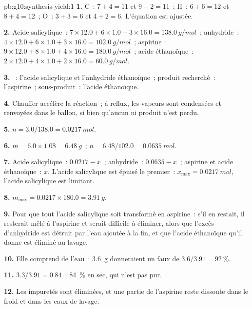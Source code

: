 \begin{solution}{pb:g10:synthesis-yield:1}
\textbf{1.} C~: $7 + 4 = 11$ et $9 + 2 = 11$~; H~: $6 + 6 = 12$ et
$8 + 4 = 12$~; O~: $3 + 3 = 6$ et $4 + 2 = 6$. L'équation est ajustée.

\textbf{2.} Acide salicylique~: $7 \times 12.0 + 6 \times 1.0 + 3 \times 16.0
= \qty{138.0}{g/mol}$~; anhydride~: $4 \times 12.0 + 6 \times 1.0 +
3 \times 16.0 = \qty{102.0}{g/mol}$~; aspirine~: $9 \times 12.0 + 8 \times
1.0 + 4 \times 16.0 = \qty{180.0}{g/mol}$~; acide éthanoïque~: $2 \times 12.0
+ 4 \times 1.0 + 2 \times 16.0 = \qty{60.0}{g/mol}$.

\textbf{3.} ~: l'acide salicylique et l'anhydride éthanoïque~;
produit recherché~: l'aspirine~; sous-produit~: l'acide éthanoïque.

\textbf{4.} Chauffer accélère la réaction~; à reflux, les vapeurs sont
condensées et renvoyées dans le ballon, si bien qu'aucun  ni
produit n'est perdu.

\textbf{5.} $n = 3.0 / 138.0 = \qty{0.0217}{mol}$.

\textbf{6.} $m = 6.0 \times 1.08 = \qty{6.48}{g}$~;
$n = 6.48 / 102.0 = \qty{0.0635}{mol}$.

\textbf{7.} Acide salicylique~: $0.0217 - x$~; anhydride~: $0.0635 - x$~;
aspirine et acide éthanoïque~: $x$. L'acide salicylique est épuisé le
premier~: $x_{\max} = \qty{0.0217}{mol}$, l'acide salicylique est
limitant.

\textbf{8.} $m_{\max} = 0.0217 \times 180.0 = \qty{3.91}{g}$.

\textbf{9.} Pour que tout l'acide salicylique soit transformé en
aspirine~: s'il en restait, il resterait mêlé à l'aspirine et serait
difficile à éliminer, alors que l'excès d'anhydride est détruit par l'eau
ajoutée à la fin, et que l'acide éthanoïque qu'il donne est éliminé au
lavage.

\textbf{10.} Elle comprend de l'eau~: \qty{3.6}{g} donneraient un faux
 de $3.6 / 3.91 = \qty{92}{\percent}$.

\textbf{11.} $3.3 / 3.91 = 0.84$~: \qty{84}{\percent} en  sec,
qui n'est pas pur.

\textbf{12.} Les impuretés sont éliminées, et une partie de l'aspirine
reste dissoute dans le  froid et dans les eaux de lavage.


\end{solution}
